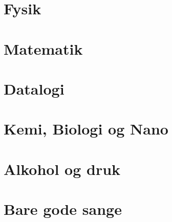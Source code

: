 \documentclass[12pt]{book}
\begin{document}
\onecolumn
\chapter*{Fysik}
\twocolumn








\onecolumn
\chapter*{Matematik}
\twocolumn











\onecolumn
\chapter*{Datalogi}
\twocolumn











\onecolumn
\chapter*{Kemi, Biologi og Nano}
\twocolumn











\onecolumn
\chapter*{Alkohol og druk}
\twocolumn



\onecolumn
\chapter*{Bare gode sange}
\twocolumn









% 
\end{document}
